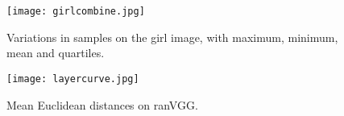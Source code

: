 \documentclass{article}
\begin{document}
\begin{figure}[htbp]
\centering
	\begin{minipage}[b]{0.63\textwidth}
		\centering
		\texttt{[image: girlcombine.jpg]}
	    \vspace{-0.5em}
		\caption{Variations in samples on the girl image, with maximum, minimum, mean and quartiles.}
    	\label{fig:girl}
	\end{minipage} \hfill
	\begin{minipage}[b]{0.33\textwidth}
		\texttt{[image: layercurve.jpg]}
    	\vspace{-0.5em}
	    \caption{Mean Euclidean distances on ranVGG.}
        \label{fig:meanEdisCurve}
	\end{minipage}
\end{figure}





\end{document}
